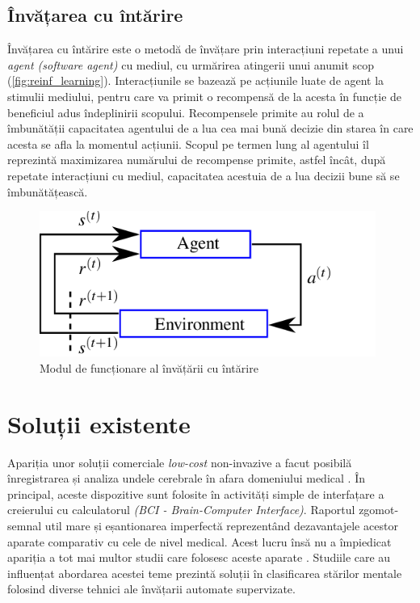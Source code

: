 \subsection*{Învățarea cu întărire}
Învățarea cu întărire este o metodă de învățare prin interacțiuni repetate a unui \textit{agent (software agent)} cu mediul, cu urmărirea atingerii unui anumit scop (\autoref*{fig:reinf_learning}). Interacțiunile se bazează pe acțiunile luate de agent la stimulii mediului, pentru care va primit o recompensă de la acesta în funcție de beneficiul adus îndeplinirii scopului. Recompensele primite au rolul de a îmbunătății capacitatea agentului de a lua cea mai bună decizie din starea în care acesta se afla la momentul acțiunii. Scopul pe termen lung al agentului îl reprezintă maximizarea numărului de recompense primite, astfel încât, după repetate interacțiuni cu mediul, capacitatea acestuia de a lua decizii bune să se îmbunătățească.
\begin{figure}[H]
	\center
	\includegraphics[width=11cm, keepaspectratio]{fig/cap1/The-reinforcement-learning-paradigm-consists-of-an-agent-interacting-with-an.png}
	\caption{Modul de funcționare al învățării cu întărire \cite{fig:reinforcement}}
	\label{fig:reinf_learning}
\end{figure}

\section{Soluții existente}
Apariția unor soluții comerciale \textit{low-cost} non-invazive a facut posibilă înregistrarea și analiza undele cerebrale în afara domeniului medical \cite{online:emotiv}. În principal, aceste dispozitive sunt folosite în activități simple de interfațare a creierului cu calculatorul \textit{(BCI - Brain-Computer Interface)}. Raportul zgomot-semnal util mare și eșantionarea imperfectă reprezentând dezavantajele acestor aparate comparativ cu cele de nivel medical. Acest lucru însă nu a împiedicat apariția a tot mai multor studii care folosesc aceste aparate \cite{consumer-eeg:2018}. Studiile care au influențat abordarea acestei teme prezintă soluții în clasificarea stărilor mentale folosind diverse tehnici ale învățarii automate supervizate.

